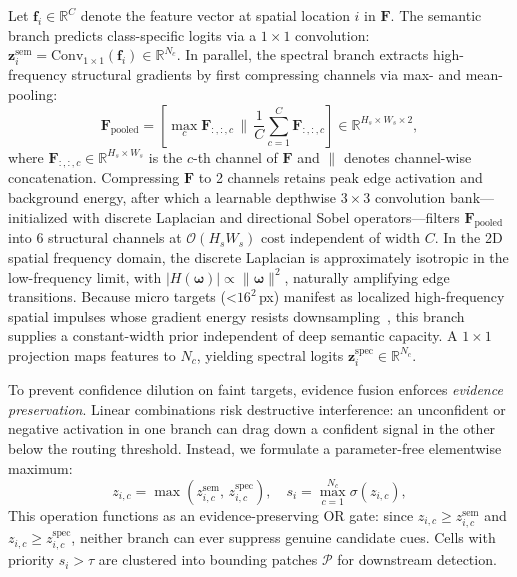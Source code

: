 Let $\mathbf{f}_i \in \mathbb{R}^C$ denote the feature vector at spatial location $i$ in $\mathbf{F}$. The semantic branch predicts class-specific logits via a $1\times 1$ convolution: $\mathbf{z}^{\mathrm{sem}}_i = \mathrm{Conv}_{1\times 1}(\mathbf{f}_i) \in \mathbb{R}^{N_c}$. In parallel, the spectral branch extracts high-frequency structural gradients by first compressing channels via max- and mean-pooling:
\begin{equation}
\mathbf{F}_{\mathrm{pooled}} = \left[ \max_c \mathbf{F}_{:,:,c} \,\|\, \frac{1}{C}\sum_{c=1}^C \mathbf{F}_{:,:,c} \right] \in \mathbb{R}^{H_s \times W_s \times 2},
\label{eq:channel_pool}
\end{equation}
where $\mathbf{F}_{:,:,c} \in \mathbb{R}^{H_s \times W_s}$ is the $c$-th channel of $\mathbf{F}$ and $\|$ denotes channel-wise concatenation. Compressing $\mathbf{F}$ to 2 channels retains peak edge activation and background energy, after which a learnable depthwise $3\times 3$ convolution bank---initialized with discrete Laplacian and directional Sobel operators---filters $\mathbf{F}_{\mathrm{pooled}}$ into 6 structural channels at $\mathcal{O}(H_s W_s)$ cost independent of width $C$. In the 2D spatial frequency domain, the discrete Laplacian is approximately isotropic in the low-frequency limit, with $|H(\mathbf{\omega})| \propto \|\mathbf{\omega}\|^2$, naturally amplifying edge transitions. Because micro targets (\textless$16^2$\,px) manifest as localized high-frequency spatial impulses whose gradient energy resists downsampling~\cite{Zhao2025TGRS}, this branch supplies a constant-width prior independent of deep semantic capacity. A $1\times 1$ projection maps features to $N_c$, yielding spectral logits $\mathbf{z}^{\mathrm{spec}}_i \in \mathbb{R}^{N_c}$.

To prevent confidence dilution on faint targets, evidence fusion enforces \emph{evidence preservation}. Linear combinations risk destructive interference: an unconfident or negative activation in one branch can drag down a confident signal in the other below the routing threshold. Instead, we formulate a parameter-free elementwise maximum:
\begin{equation}
z_{i,c} = \max\!\left(z^{\mathrm{sem}}_{i,c},\, z^{\mathrm{spec}}_{i,c}\right), \quad s_i = \max_{c=1}^{N_c} \sigma(z_{i,c}),
\label{eq:fusion}
\end{equation}
This operation functions as an evidence-preserving OR gate: since $z_{i,c} \ge z^{\mathrm{sem}}_{i,c}$ and $z_{i,c} \ge z^{\mathrm{spec}}_{i,c}$, neither branch can ever suppress genuine candidate cues. Cells with priority $s_i > \tau$ are clustered into bounding patches $\mathcal{P}$ for downstream detection.

